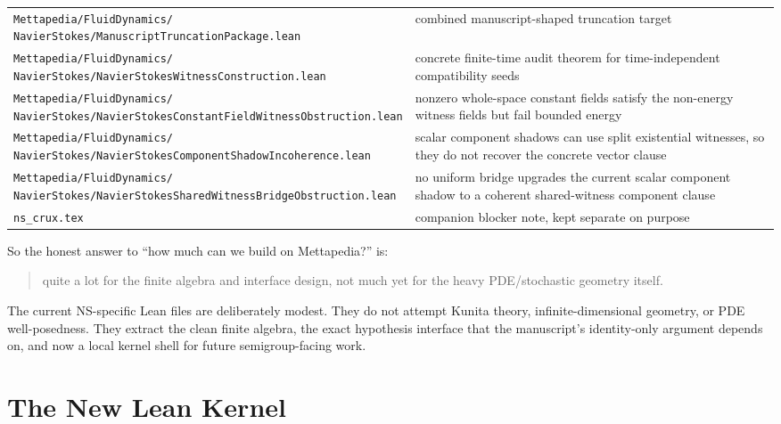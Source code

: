 \documentclass[11pt]{article}
\theoremstyle{remark}
\begin{document}
\begin{center}
\begin{tabular}{p{}p{}}
\shortstack[l]{\texttt{Mettapedia/FluidDynamics/}\\\texttt{NavierStokes/ManuscriptTruncationPackage.lean}} & combined manuscript-shaped truncation target \\
\shortstack[l]{\texttt{Mettapedia/FluidDynamics/}\\\texttt{NavierStokes/NavierStokesWitnessConstruction.lean}} & concrete finite-time audit theorem for time-independent compatibility seeds \\
\shortstack[l]{\texttt{Mettapedia/FluidDynamics/}\\\texttt{NavierStokes/NavierStokesConstantFieldWitnessObstruction.lean}} & nonzero whole-space constant fields satisfy the non-energy witness fields but fail bounded energy \\
\shortstack[l]{\texttt{Mettapedia/FluidDynamics/}\\\texttt{NavierStokes/NavierStokesComponentShadowIncoherence.lean}} & scalar component shadows can use split existential witnesses, so they do not recover the concrete vector clause \\
\shortstack[l]{\texttt{Mettapedia/FluidDynamics/}\\\texttt{NavierStokes/NavierStokesSharedWitnessBridgeObstruction.lean}} & no uniform bridge upgrades the current scalar component shadow to a coherent shared-witness component clause \\
\texttt{ns\_crux.tex} & companion blocker note, kept separate on purpose \\
\bottomrule
\end{tabular}
\end{center}

So the honest answer to ``how much can we build on Mettapedia?'' is:
\begin{quote}
quite a lot for the finite algebra and interface design, not much yet for the
heavy PDE/stochastic geometry itself.
\end{quote}

The current NS-specific Lean files are deliberately modest.  They do not attempt
Kunita theory, infinite-dimensional geometry, or PDE well-posedness.  They
extract the clean finite algebra, the exact hypothesis interface that the
manuscript's identity-only argument depends on, and now a local kernel shell
for future semigroup-facing work.

\section{The New Lean Kernel}
\end{document}
